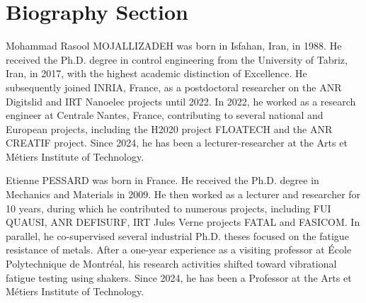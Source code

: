 \documentclass[lettersize,journal]{IEEEtran}
\begin{document}
\newpage

\section{Biography Section}
 

\begin{IEEEbiography}{Mohammad Rasool MOJALLIZADEH} was born in Isfahan, Iran, in 1988. He
received the Ph.D. degree in control engineering from the University of Tabriz, Iran, in 2017, with the highest academic distinction of Excellence. He subsequently joined INRIA, France, as a postdoctoral researcher on the ANR Digitslid and IRT Nanoelec projects until 2022. In 2022, he worked as a research engineer at Centrale Nantes, France, contributing to several national and European projects, including the H2020 project FLOATECH and the ANR CREATIF project. Since 2024, he has been a lecturer-researcher at the Arts et Métiers Institute of Technology.
\end{IEEEbiography}

\vspace{11pt}

\begin{IEEEbiography}{Etienne PESSARD} was born in France. He received the Ph.D. degree in Mechanics and Materials in 2009. He then worked as a lecturer and researcher for 10 years, during which he contributed to numerous projects, including FUI QUAUSI, ANR DEFISURF, IRT Jules Verne projects FATAL and FASICOM. In parallel, he co-supervised several industrial Ph.D. theses focused on the fatigue resistance of metals. After a one-year experience as a visiting professor at École Polytechnique de Montréal, his research activities shifted toward vibrational fatigue testing using shakers. Since 2024, he has been a Professor at the Arts et Métiers Institute of Technology.

\end{IEEEbiography}
\end{document}
